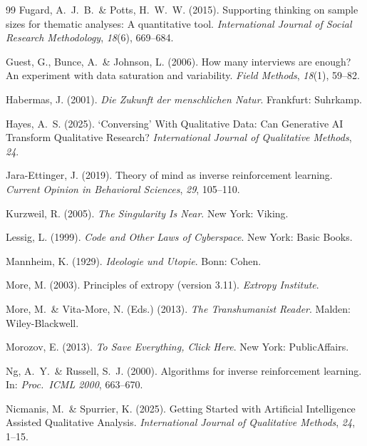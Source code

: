 \documentclass[12pt,a4paper]{article}
\begin{document}
\begin{thebibliography}{99}
  Fugard, A.~J.~B.~\& Potts, H.~W.~W. (2015).
  Supporting thinking on sample sizes for thematic analyses: A quantitative tool.
  \textit{International Journal of Social Research Methodology}, \textit{18}(6), 669--684.

  Guest, G., Bunce, A.~\& Johnson, L. (2006).
  How many interviews are enough? An experiment with data saturation and variability.
  \textit{Field Methods}, \textit{18}(1), 59--82.

  Habermas, J. (2001).
  \textit{Die Zukunft der menschlichen Natur}.
  Frankfurt: Suhrkamp.

  Hayes, A.~S. (2025).
  `Conversing' With Qualitative Data: Can Generative AI Transform Qualitative Research?
  \textit{International Journal of Qualitative Methods}, \textit{24}.

  Jara-Ettinger, J. (2019).
  Theory of mind as inverse reinforcement learning.
  \textit{Current Opinion in Behavioral Sciences}, \textit{29}, 105--110.

  Kurzweil, R. (2005).
  \textit{The Singularity Is Near}.
  New York: Viking.

  Lessig, L. (1999).
  \textit{Code and Other Laws of Cyberspace}.
  New York: Basic Books.

  Mannheim, K. (1929).
  \textit{Ideologie und Utopie}.
  Bonn: Cohen.

  More, M. (2003).
  Principles of extropy (version 3.11).
  \textit{Extropy Institute}.

  More, M.~\& Vita-More, N. (Eds.) (2013).
  \textit{The Transhumanist Reader}.
  Malden: Wiley-Blackwell.

  Morozov, E. (2013).
  \textit{To Save Everything, Click Here}.
  New York: PublicAffairs.

  Ng, A.~Y.~\& Russell, S.~J. (2000).
  Algorithms for inverse reinforcement learning.
  In: \textit{Proc.\ ICML 2000}, 663--670.

  Nicmanis, M.~\& Spurrier, K. (2025).
  Getting Started with Artificial Intelligence Assisted Qualitative Analysis.
  \textit{International Journal of Qualitative Methods}, \textit{24}, 1--15.


\end{thebibliography}
\end{document}
